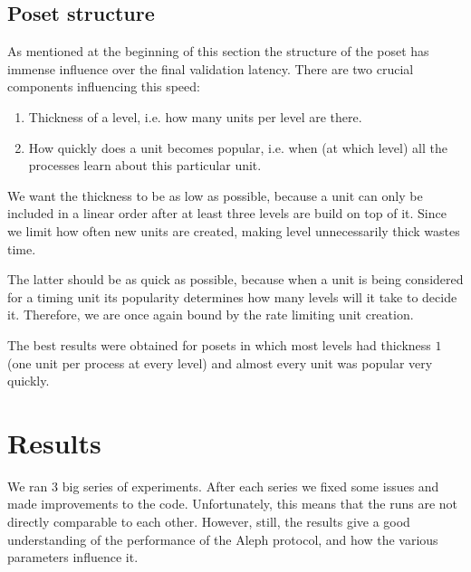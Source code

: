 \documentclass[a4paper,10pt]{article}
\begin{document}
		\subsection{Poset structure}
		 \label{ssec:posetShape}
			As mentioned at the beginning of this section the structure of the poset has immense influence over the final validation latency.
			There are two crucial components influencing this speed:
			\begin{enumerate}
				\item Thickness of a level, i.e. how many units per level are there.
				\item How quickly does a unit becomes popular, i.e. when (at which level) all the processes learn about this particular unit.
			\end{enumerate}
			We want the thickness to be as low as possible, because a unit can only be included in a linear order after at least three levels are build on top of it.
			Since we limit how often new units are created, making level unnecessarily thick wastes time.

			The latter should be as quick as possible, because when a unit is being considered for a timing unit its popularity determines how many levels will it take to decide it.
		 Therefore, we are once again bound by the rate limiting unit creation.

			The best results were obtained for posets in which most levels had thickness $1$ (one unit per process at every level) and almost every unit was popular very quickly.
	\section{Results}
	 We ran 3 big series of experiments. After each series we fixed some issues and made improvements to the code.
	 	Unfortunately, this means that the runs are not directly comparable to each other.
	 	However, still, the results give a good understanding of the performance of the Aleph protocol, and how the various parameters influence it.
\end{document}

